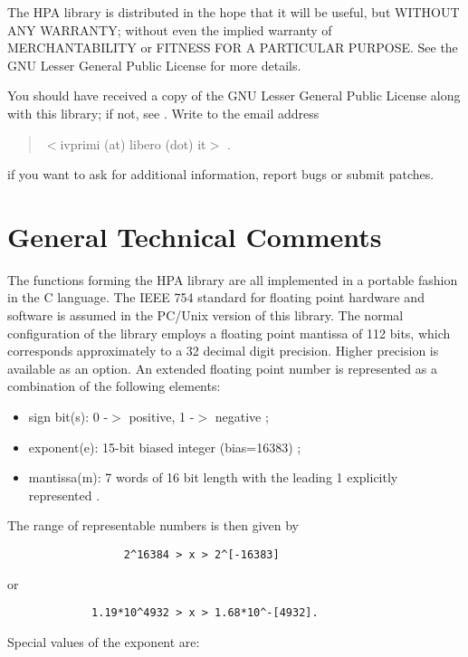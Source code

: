 \documentclass{article}
\begin{document}
The HPA library is distributed in the hope that it will be useful,
but WITHOUT ANY WARRANTY; without even the implied warranty of
MERCHANTABILITY or FITNESS FOR A PARTICULAR PURPOSE.  See the
GNU Lesser General Public License for more details.

You should have received a copy of the GNU Lesser General Public License
along with this library; if not, see  .
Write to the email address

	\begin{quotation}
$<$ivprimi (at) libero (dot) it$>$                                      .
	\end{quotation}

if you want to ask for additional information, report bugs or submit patches.


\hypertarget{toc3}{}
\section{General Technical Comments}
The functions forming the HPA library are all implemented in a portable 
fashion in the C language.
The IEEE 754 standard for floating point hardware and software is assumed
in the PC/Unix version of this library. The normal configuration of the library
employs a floating point mantissa of 112 bits, which corresponds approximately to a 
32 decimal digit precision. Higher precision is available as an option.
An extended floating point number is represented as a combination of the
following elements:

\begin{itemize}
\item sign bit(s): 0 -$>$ positive, 1 -$>$ negative ;
\item exponent(e): 15-bit biased integer (bias=16383) ;
\item mantissa(m): 7 words of 16 bit length with the leading 1 explicitly represented .
\end{itemize}

The range of representable numbers is then given by

\begin{verbatim}
                  2^16384 > x > 2^[-16383]
\end{verbatim}
or

\begin{verbatim}
             1.19*10^4932 > x > 1.68*10^-[4932].
\end{verbatim}
Special values of the exponent are:
\end{document}
